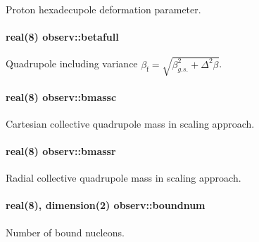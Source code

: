 Proton hexadecupole deformation parameter. 

\paragraph[{\texorpdfstring{betafull}{betafull}}]{\setlength{\rightskip}{0pt plus 5cm}real(8) observ\+::betafull}\hypertarget{namespaceobserv_a83b0ac43dc656fabd27cb889e02496bc}{}\label{namespaceobserv_a83b0ac43dc656fabd27cb889e02496bc}


Quadrupole including variance $\beta_\mathrm{f}=\sqrt{\beta_{g.s.}^2+\Delta^2\beta}$. 

\paragraph[{\texorpdfstring{bmassc}{bmassc}}]{\setlength{\rightskip}{0pt plus 5cm}real(8) observ\+::bmassc}\hypertarget{namespaceobserv_a11476aea6a4dfc6718d071f1408a32b5}{}\label{namespaceobserv_a11476aea6a4dfc6718d071f1408a32b5}


Cartesian collective quadrupole mass in scaling approach. 

\paragraph[{\texorpdfstring{bmassr}{bmassr}}]{\setlength{\rightskip}{0pt plus 5cm}real(8) observ\+::bmassr}\hypertarget{namespaceobserv_a695c136a636f71d44a9dcff1c045f506}{}\label{namespaceobserv_a695c136a636f71d44a9dcff1c045f506}


Radial collective quadrupole mass in scaling approach. 

\paragraph[{\texorpdfstring{boundnum}{boundnum}}]{\setlength{\rightskip}{0pt plus 5cm}real(8), dimension(2) observ\+::boundnum}\hypertarget{namespaceobserv_aa4177808cf29e88750de09e971052d7c}{}\label{namespaceobserv_aa4177808cf29e88750de09e971052d7c}


Number of bound nucleons. 

